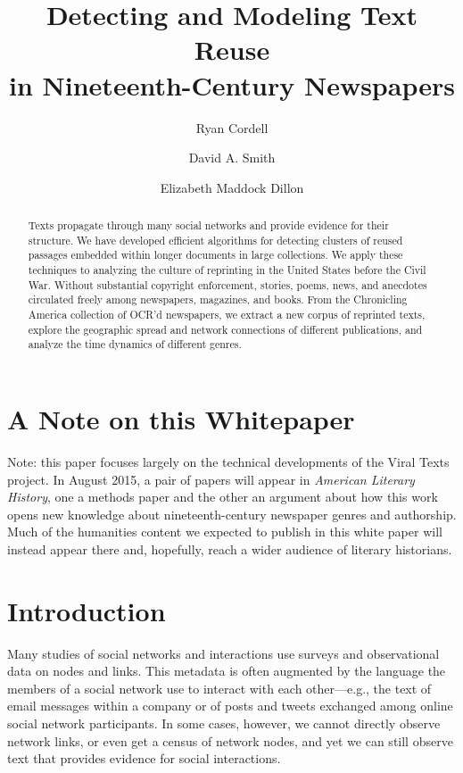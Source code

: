\documentclass[pdftex,11pt]{article}
\begin{document}
\title{Detecting and Modeling Text Reuse \\ in Nineteenth-Century Newspapers}

\author{Ryan Cordell \and David A. Smith \and Elizabeth Maddock Dillon}

\date{}

\maketitle


\begin{abstract}
  Texts propagate through many social networks and provide evidence
  for their structure.  We have developed efficient algorithms for detecting
  clusters of reused passages embedded within longer documents in
  large collections.  We apply these techniques to analyzing the
  culture of reprinting in the United States before the Civil War.
  Without substantial copyright enforcement, stories, poems, news, and
  anecdotes circulated freely among newspapers, magazines, and books.
  From the Chronicling America collection of OCR'd newspapers, we extract a new corpus of
  reprinted texts, explore the geographic spread and network
  connections of different publications, and analyze the time dynamics
  of different genres.
\end{abstract}

\section{A Note on this Whitepaper}
\label{sec:note}
Note: this paper focuses largely on the technical developments of the
Viral Texts project.  In August 2015, a pair of papers will appear in
\emph{American Literary History}, one a methods paper and the other an
argument about how this work opens new knowledge about
nineteenth-century newspaper genres and authorship. Much of the humanities content we expected to publish in this white paper will instead appear there and, hopefully, reach a wider audience of literary historians.

\section{Introduction}
\label{sec:intro}
Many studies of social networks and interactions use surveys and
observational data on nodes and links.  This metadata is often
augmented by the language the members of a social network use to
interact with each other---e.g., the text of email messages within a
company or of posts and tweets exchanged among online social network
participants.  In some cases, however, we cannot directly observe
network links, or even get a census of network nodes, and yet we can
still observe text that provides evidence for social interactions.
\end{document}

